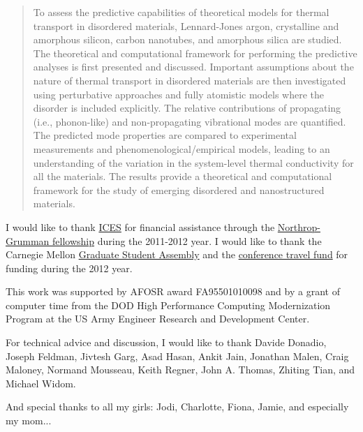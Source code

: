 \documentclass[12pt]{cmuthesis}
\begin{document}
\begin{abstract}
To assess the predictive capabilities of theoretical models for thermal
transport in disordered materials, Lennard-Jones argon, crystalline and
amorphous silicon, carbon nanotubes, and amorphous silica are studied. The
theoretical and computational framework for performing the predictive
analyses is first presented and discussed. Important assumptions about the
nature of thermal transport in disordered materials are then investigated
using perturbative approaches and fully atomistic models where the disorder
is included explicitly. The relative contributions of propagating (i.e.,
phonon-like) and non-propagating vibrational modes are quantified. The
predicted mode properties are compared to experimental measurements and
phenomenological/empirical models, leading to an understanding of the
variation in the system-level thermal conductivity for all the materials.
The results provide a theoretical and computational framework for the study
of emerging disordered and nanostructured materials.
\end{abstract}


\begin{acknowledgments}

I would like to thank 
\href{http://www.ices.cmu.edu/home.asp}{ICES} 
for financial assistance through the 
\href{http://www.ices.cmu.edu/northrop-grumman.asp}
{Northrop-Grumman fellowship} during the 2011-2012 year. 
I would like to thank the Carnegie Mellon 
\href{http://www.cmu.edu/stugov/gsa/}{Graduate Student Assembly} and the 
\href{http://www.cmu.edu/graduate/professional-development/conference-funding/}
{conference travel fund} for funding during the 2012 year.

This work was supported by AFOSR award FA95501010098 and by a grant 
of computer time from the DOD 
High Performance Computing Modernization Program at the US Army Engineer 
Research and Development Center. 

For technical advice and discussion, I would like to thank  
Davide Donadio, Joseph Feldman, Jivtesh Garg, Asad Hasan, 
Ankit Jain, Jonathan Malen, Craig Maloney, Normand Mousseau,  
Keith Regner, John A. Thomas, Zhiting Tian, and Michael Widom. 

And special thanks to all my girls: Jodi, Charlotte, Fiona, 
Jamie, and especially my mom...
\end{acknowledgments}
\end{document}
